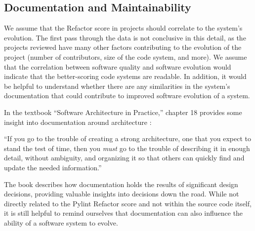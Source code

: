 \subsection{Documentation and Maintainability} \label{subDocumentation}


We assume that the Refactor score in projects should correlate to the system's evolution. The first pass through the data is not conclusive in this detail, as the projects reviewed have many other factors contributing to the evolution of the project (number of contributors, size of the code system, and more). We assume that the correlation between software quality and software evolution would indicate that the better-scoring code systems are readable. In addition, it would be helpful to understand whether there are any similarities in the system's documentation that could contribute to improved software evolution of a system.




In the textbook ``Software Architecture in Practice,'' chapter 18 provides some insight into documentation around architecture \cite{book:software-architecture-in-practice}:

\vspace{0.25cm}
\begin{displayquote}
  ``If you go to the trouble of creating a strong architecture, one that you expect to stand the test of time, then you \textit{must} go to the trouble of describing it in enough detail, without ambiguity, and organizing it so that others can quickly find and update the needed information.''
\end{displayquote}
\vspace{0.25cm}

The book describes how documentation holds the results of significant design decisions, providing valuable insights into decisions down the road. While not directly related to the Pylint Refactor score and not within the source code itself, it is still helpful to remind ourselves that documentation can also influence the ability of a software system to evolve.

